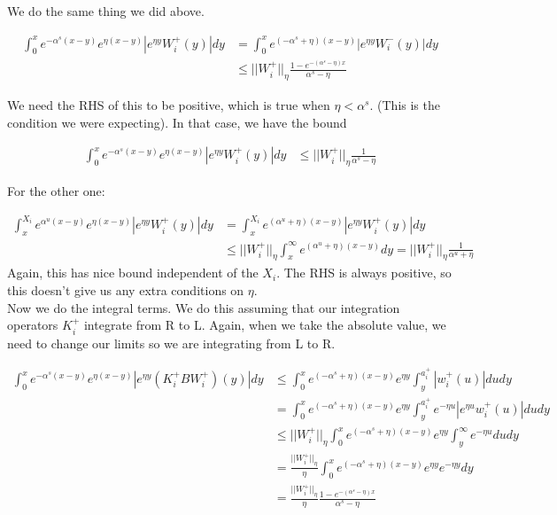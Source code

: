 \documentclass[12pt]{article}
\begin{document}
We do the same thing we did above.

\begin{align*}
\int_0^x e^{-\alpha^s (x-y)}e^{\eta(x-y)}|e^{\eta y} W_i^+(y)| dy &= \int_0^x e^{(-\alpha^s + \eta) (x-y)}|e^{\eta y} W_i^-(y)| dy \\
&\leq ||W_i^+||_\eta \frac{1 - e^{-(\alpha^s - \eta)x} }{\alpha^s - \eta}
\end{align*}

We need the RHS of this to be positive, which is true when $\eta < \alpha^s$. (This is the condition we were expecting). In that case, we have the bound

\begin{align*}
\int_0^x e^{-\alpha^s (x-y)}e^{\eta(x-y)}|e^{\eta y} W_i^+(y)| dy &\leq ||W_i^+||_\eta \frac{1}{\alpha^s - \eta}
\end{align*}

For the other one:

\begin{align*}
\int_x^{X_i} e^{\alpha^u (x-y)}e^{\eta(x-y)}|e^{\eta y} W_i^+(y)| dy &= \int_x^{X_i} e^{(\alpha^u + \eta) (x-y)}|e^{\eta y} W_i^+(y)| dy \\
&\leq ||W_i^+||_\eta \int_x^{\infty} e^{(\alpha^u + \eta) (x-y)} dy = ||W_i^+||_\eta \frac{1}{\alpha^u + \eta}
\end{align*}
Again, this has nice bound independent of the $X_i$. The RHS is always positive, so this doesn't give us any extra conditions on $\eta$. \\

Now we do the integral terms. We do this assuming that our integration operators $K_i^+$ integrate from R to L. Again, when we take the absolute value, we need to change our limits so we are integrating from L to R.

\begin{align*}
\int_0^x e^{-\alpha^s (x-y)}e^{\eta(x-y)}|e^{\eta y} (K_i^+ B W_i^+)(y)| dy &\leq \int_0^x e^{(-\alpha^s + \eta)(x-y)}e^{\eta y} \int_y^{a_i^+} |w_i^+(u)| du dy \\
&= \int_0^x e^{(-\alpha^s + \eta)(x-y)}e^{\eta y} \int_y^{a_i^+} e^{-\eta u} |e^{\eta u} w_i^+(u)| du dy \\
&\leq ||W_i^+||_\eta \int_0^x e^{(-\alpha^s + \eta)(x-y)}e^{\eta y} \int_y^\infty e^{-\eta u} du dy \\
&= \frac{||W_i^+||_\eta}{\eta} \int_0^x e^{(-\alpha^s + \eta)(x-y)}e^{\eta y} e^{-\eta y} dy \\
&= \frac{||W_i^+||_\eta}{\eta} \frac{1 - e^{-(\alpha^s - \eta)x}}{\alpha^s - \eta} 
\end{align*}
\end{document}
